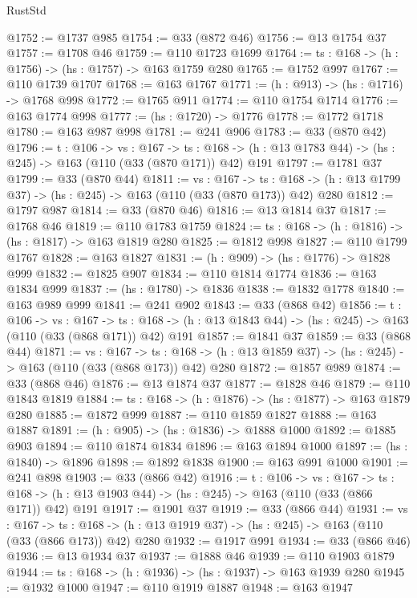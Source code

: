 \begin{lexlean}{RustStd}
\begin{coremodule}
@1752 := @1737 @985
@1754 := @33 (@872 @46)
@1756 := @13 @1754 @37
@1757 := @1708 @46
@1759 := @110 @1723 @1699
@1764 := {ts : @168} -> (h : @1756) -> (hs : @1757) -> @163 @1759 @280
@1765 := @1752 @997
@1767 := @110 @1739 @1707
@1768 := @163 @1767
@1771 := (h : @913) -> (hs : @1716) -> @1768 @998
@1772 := @1765 @911
@1774 := @110 @1754 @1714
@1776 := @163 @1774 @998
@1777 := (hs : @1720) -> @1776
@1778 := @1772 @1718
@1780 := @163 @987 @998
@1781 := @241 @906
@1783 := @33 (@870 @42)
@1796 := {t : @106} ->
  {vs : @167} ->
  {ts : @168} -> (h : @13 @1783 @44) -> (hs : @245) -> @163 (@110 (@33 (@870 @171)) @42) @191
@1797 := @1781 @37
@1799 := @33 (@870 @44)
@1811 := {vs : @167} ->
  {ts : @168} -> (h : @13 @1799 @37) -> (hs : @245) -> @163 (@110 (@33 (@870 @173)) @42) @280
@1812 := @1797 @987
@1814 := @33 (@870 @46)
@1816 := @13 @1814 @37
@1817 := @1768 @46
@1819 := @110 @1783 @1759
@1824 := {ts : @168} -> (h : @1816) -> (hs : @1817) -> @163 @1819 @280
@1825 := @1812 @998
@1827 := @110 @1799 @1767
@1828 := @163 @1827
@1831 := (h : @909) -> (hs : @1776) -> @1828 @999
@1832 := @1825 @907
@1834 := @110 @1814 @1774
@1836 := @163 @1834 @999
@1837 := (hs : @1780) -> @1836
@1838 := @1832 @1778
@1840 := @163 @989 @999
@1841 := @241 @902
@1843 := @33 (@868 @42)
@1856 := {t : @106} ->
  {vs : @167} ->
  {ts : @168} -> (h : @13 @1843 @44) -> (hs : @245) -> @163 (@110 (@33 (@868 @171)) @42) @191
@1857 := @1841 @37
@1859 := @33 (@868 @44)
@1871 := {vs : @167} ->
  {ts : @168} -> (h : @13 @1859 @37) -> (hs : @245) -> @163 (@110 (@33 (@868 @173)) @42) @280
@1872 := @1857 @989
@1874 := @33 (@868 @46)
@1876 := @13 @1874 @37
@1877 := @1828 @46
@1879 := @110 @1843 @1819
@1884 := {ts : @168} -> (h : @1876) -> (hs : @1877) -> @163 @1879 @280
@1885 := @1872 @999
@1887 := @110 @1859 @1827
@1888 := @163 @1887
@1891 := (h : @905) -> (hs : @1836) -> @1888 @1000
@1892 := @1885 @903
@1894 := @110 @1874 @1834
@1896 := @163 @1894 @1000
@1897 := (hs : @1840) -> @1896
@1898 := @1892 @1838
@1900 := @163 @991 @1000
@1901 := @241 @898
@1903 := @33 (@866 @42)
@1916 := {t : @106} ->
  {vs : @167} ->
  {ts : @168} -> (h : @13 @1903 @44) -> (hs : @245) -> @163 (@110 (@33 (@866 @171)) @42) @191
@1917 := @1901 @37
@1919 := @33 (@866 @44)
@1931 := {vs : @167} ->
  {ts : @168} -> (h : @13 @1919 @37) -> (hs : @245) -> @163 (@110 (@33 (@866 @173)) @42) @280
@1932 := @1917 @991
@1934 := @33 (@866 @46)
@1936 := @13 @1934 @37
@1937 := @1888 @46
@1939 := @110 @1903 @1879
@1944 := {ts : @168} -> (h : @1936) -> (hs : @1937) -> @163 @1939 @280
@1945 := @1932 @1000
@1947 := @110 @1919 @1887
@1948 := @163 @1947

\end{coremodule}
\end{lexlean}
